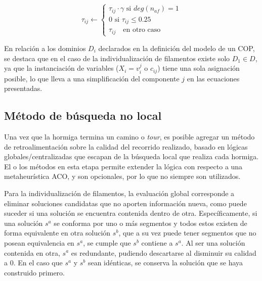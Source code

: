 \begin{equation}
    \tau_{ij} \leftarrow
        \begin{cases}
         \tau_{ij} \cdot \gamma \text{ si } deg(n_{af}) = 1  \\[3ex]
        
        \text{0 si } \tau_{ij} \leq 0.25 \\[3ex]
        \tau_{ij} \quad \text{en otro caso}
        \end{cases}
    \label{eq:antiPheroSAP_neuron}
\end{equation}


En relaci\'on a los dominios $D_i$ declarados en la definici\'on del modelo de un COP, se destaca que en el caso de la individualizaci\'on de filamentos existe solo $D_1 \in D$, ya que la instanciaci\'on de variables ($X_i = v_{i}^{j}$ o $c_{ij}$) tiene una sola asignaci\'on posible, lo que lleva a una simplificaci\'on del componente $j$ en las ecuaciones presentadas.

\subsection{M\'etodo de b\'usqueda no local}
Una vez que la hormiga termina un camino o {\it tour}, es posible agregar un m\'etodo de retroalimentaci\'on sobre la calidad del recorrido realizado, basado en l\'ogicas globales/centralizadas que escapan de la b\'usqueda local que realiza cada hormiga. El o los m\'etodos en esta etapa permite extender la l\'ogica con respecto a una metaheur\'istica ACO, y son opcionales, por lo que no siempre son utilizados. 

Para la individualizaci\'on de filamentos, la evaluaci\'on global corresponde a eliminar soluciones candidatas que no aporten informaci\'on nueva, como puede suceder si una soluci\'on se encuentra contenida dentro de otra. Espec\'ificamente, si una soluci\'on $s^{a}$ se conforma por uno o m\'as segmentos y todos estos existen de forma equivalente en otra soluci\'on $s^{b}$, que a su vez puede tener segmentos que no posean equivalencia en $s^{a}$, se cumple que $s^{b}$ contiene a $s^{a}$. Al ser una soluci\'on contenida en otra, $s^{a}$ es redundante, pudiendo descartarse al disminuir su calidad a 0. En el caso que $s^{a}$ y $s^{b}$ sean id\'enticas, se conserva la soluci\'on que se haya construido primero. 
 
